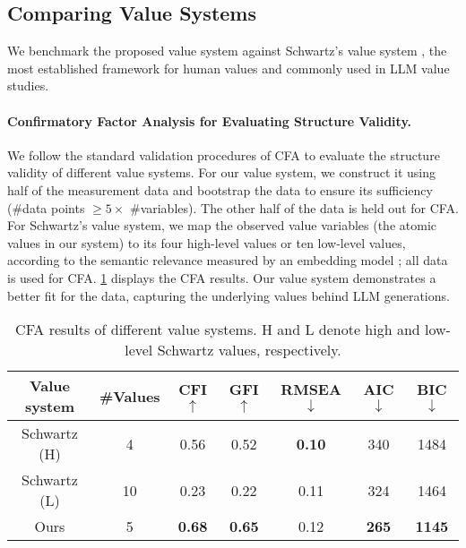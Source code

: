\subsection{Comparing Value Systems}
\label{sec:comparing value systems}

We benchmark the proposed value system against Schwartz's value system \cite{schwartz2012overview}, the most established framework for human values and commonly used in LLM value studies.

\paragraph{Confirmatory Factor Analysis for Evaluating Structure Validity.}
We follow the standard validation procedures of CFA \cite{schwartz2004cfa} to evaluate the structure validity of different value systems. For our value system, we construct it using half of the measurement data and bootstrap the data to ensure its sufficiency (\#data points \( \ge 5 \times \) \#variables). The other half of the data is held out for CFA. For Schwartz's value system, we map the observed value variables (the atomic values in our system) to its four high-level values or ten low-level values, according to the semantic relevance \cite{schwartz2004cfa} measured by an embedding model \cite{openai2024textembedding3large}; all data is used for CFA. \cref{tab:cfa results} displays the CFA results. Our value system demonstrates a better fit for the data, capturing the underlying values behind LLM generations.

\begin{table}[H]
    \centering
    \begin{tabular}{c|c|ccccc}
        \toprule
        Value system & \#Values & CFI \( \uparrow \) & GFI \( \uparrow \) & RMSEA \( \downarrow \) & AIC \( \downarrow \) & BIC \( \downarrow \) \\
        \midrule
        Schwartz (H) & 4 & 0.56 & 0.52 & \textbf{0.10} & 340 & 1484 \\
        Schwartz (L) & 10 & 0.23 & 0.22 & 0.11 & 324 & 1464 \\
        Ours & 5 & \textbf{0.68} & \textbf{0.65} & 0.12 & \textbf{265} & \textbf{1145} \\
        \bottomrule
    \end{tabular}
    \caption{CFA results of different value systems. H and L denote high and low-level Schwartz values, respectively.}
    \label{tab:cfa results}
\end{table}
    


